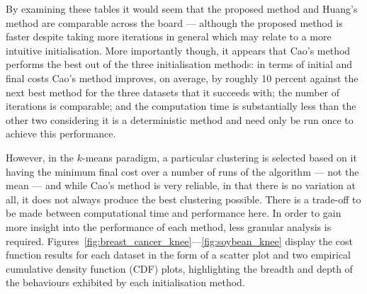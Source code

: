 \documentclass[smallextended]{svjour3}
\newlength{\tablewidth}
\begin{document}
\begin{table}[htbp]
{    }
    \label{tab:nursery_knee}\vspace{20pt}

    \label{tab:soybean_knee}
\end{table}

By examining these tables it would seem that the proposed method and Huang's
method are comparable across the board --- although the proposed method is
faster despite taking more iterations in general which may relate to a more
intuitive initialisation. More importantly though, it appears that Cao's method
performs the best out of the three initialisation methods: in terms of initial
and final costs Cao's method improves, on average, by roughly 10 percent against
the next best method for the three datasets that it succeeds with; the number of
iterations is comparable; and the computation time is substantially less than
the other two considering it is a deterministic method and need only be run once
to achieve this performance.

However, in the \(k\)-means paradigm, a particular clustering is selected based
on it having the minimum final cost over a number of runs of the algorithm ---
not the mean --- and while Cao's method is very reliable, in that there is no
variation at all, it does not always produce the best clustering possible. There
is a trade-off to be made between computational time and performance here. In
order to gain more insight into the performance of each method, less granular
analysis is required.
Figures~\ref{fig:breast_cancer_knee}---\ref{fig:soybean_knee} display the
cost function results for each dataset in the form of a scatter plot and two
empirical cumulative density function (CDF) plots, highlighting the breadth and
depth of the behaviours exhibited by each initialisation method.
\end{document}
